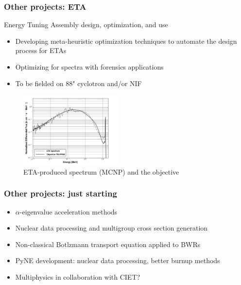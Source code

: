 \documentclass[xcolor=x11names,compress]{beamer}
\renewcommand{\(}{\begin{columns}}
\renewcommand{\)}{\end{columns}}
\newcommand{\<}[1]{\begin{column}{#1}}
\renewcommand{\>}{\end{column}}
\begin{document}
\begin{frame}[fragile]
  \frametitle{Other projects: ETA}
  
Energy Tuning Assembly design, optimization, and use

  	\begin{itemize}
  	\item Developing meta-heuristic optimization techniques %
  	to automate the design process for ETAs
  	\item Optimizing for spectra with forensics applications
  	\item To be fielded on 88" cyclotron and/or NIF
	\end{itemize}	
	\begin{center}
 	 \begin{figure}
 	 \includegraphics[height=1.5in,clip]{ETA-Obj-100g}  
 	 \caption{ETA-produced spectrum (MCNP) and the objective}
 	 \end{figure}
 	\end{center}
  
\end{frame}	


\begin{frame}[fragile]
  \frametitle{Other projects: just starting}

  	\begin{itemize}
  	\item $\alpha$-eigenvalue acceleration methods 
  	\item Nuclear data processing and multigroup cross section generation
  	\item Non-classical Botlzmann transport equation applied to BWRs
  	\item PyNE development: nuclear data processing, better burnup methods  	
  	\item Multiphysics in collaboration with CIET?
	\end{itemize}	
  
\end{frame}
\end{document}
